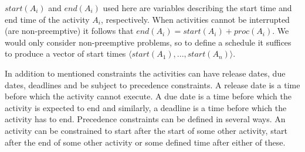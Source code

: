 \documentclass{article}
\theoremstyle{definition}
\begin{document}
$start(A_i)$ and $end(A_i)$ used here are variables describing the start time and end time of the activity $A_i$, respectively. When activities cannot be interrupted (are non-preemptive) it follows that $end(A_i) = start(A_i) + proc(A_i)$. We would only consider non-preemptive problems, so to define a schedule it suffices to produce a vector of start times $\langle start(A_1), ..., start(A_n)\rangle$.

In addition to mentioned constraints the activities can have release dates, due dates, deadlines and be subject to precedence constraints. A release date is a time before which the activity cannot execute. A due date is a time before which the activity is expected to end and similarly, a deadline is a time before which the activity has to end. Precedence constraints can be defined in several ways. An activity can be constrained to start after the start of some other activity, start after the end of some other activity or some defined time after either of these.






\end{document}
